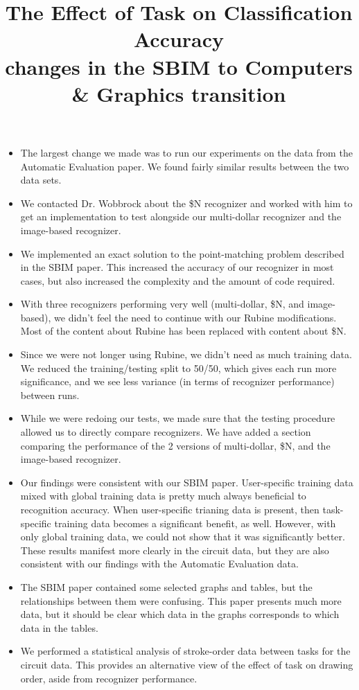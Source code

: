 \documentclass{article}
\title{The Effect of Task on Classification Accuracy \\ changes in the SBIM to Computers \& Graphics transition}
\date{}
\begin{document}
\maketitle{}

\begin{itemize}
\item The largest change we made was to run our experiments on the data from the Automatic Evaluation paper.  We found fairly similar results between the two data sets.
\item We contacted Dr. Wobbrock about the \$N recognizer and worked with him to get an implementation to test alongside our multi-dollar recognizer and the image-based recognizer.
\item We implemented an exact solution to the point-matching problem described in the SBIM paper.  This increased the accuracy of our recognizer in most cases, but also increased the complexity and the amount of code required.
\item With three recognizers performing very well (multi-dollar, \$N, and image-based), we didn't feel the need to continue with our Rubine modifications.  Most of the content about Rubine has been replaced with content about \$N.
\item Since we were not longer using Rubine, we didn't need as much training data.  We reduced the training/testing split to 50/50, which gives each run more significance, and we see less variance (in terms of recognizer performance) between runs.
\item While we were redoing our tests, we made sure that the testing procedure allowed us to directly compare recognizers. We have added a section comparing the performance of the 2 versions of multi-dollar, \$N, and the image-based recognizer.
\item Our findings were consistent with our SBIM paper.  User-specific training data mixed with global training data is pretty much always beneficial to recognition accuracy.  When user-specific trianing data is present, then task-specific training data becomes a significant benefit, as well.  However, with only global training data, we could not show that it was significantly better.  These results manifest more clearly in the circuit data, but they are also consistent with our findings with the Automatic Evaluation data.
\item The SBIM paper contained some selected graphs and tables, but the relationships between them were confusing.  This paper presents much more data, but it should be clear which data in the graphs corresponds to which data in the tables.
\item We performed a statistical analysis of stroke-order data between tasks for the circuit data.  This provides an alternative view of the effect of task on drawing order, aside from recognizer performance.
\end{itemize}
\end{document}
